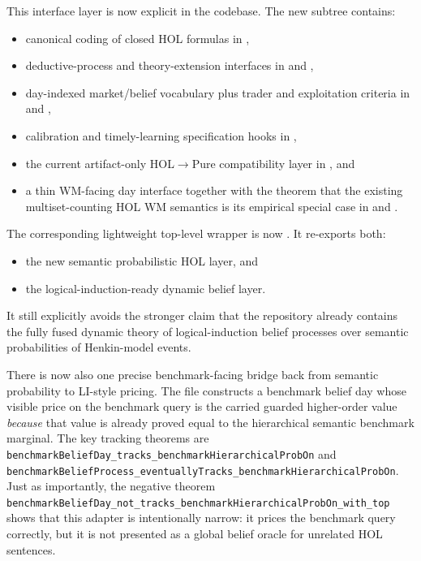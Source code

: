 \documentclass[11pt,openany]{report}
\begin{document}
This interface layer is now explicit in the codebase.  The new subtree
 contains:
\begin{itemize}
\item canonical coding of closed HOL formulas in
  ,
\item deductive-process and theory-extension interfaces in
   and
  ,
\item day-indexed market/belief vocabulary plus trader and exploitation
  criteria in
   and
  ,
\item calibration and timely-learning specification hooks in
  ,
\item the current artifact-only HOL$\to$Pure compatibility layer in
  , and
\item a thin WM-facing day interface together with the theorem that the
  existing multiset-counting HOL WM semantics is its empirical special case in
   and
  .
\end{itemize}

The corresponding lightweight top-level wrapper is now
.  It re-exports both:
\begin{itemize}
\item the new semantic probabilistic HOL layer, and
\item the logical-induction-ready dynamic belief layer.
\end{itemize}
It still explicitly avoids the stronger claim that the repository already
contains the fully fused dynamic theory of logical-induction belief processes
over semantic probabilities of Henkin-model events.

There is now also one precise benchmark-facing bridge back from semantic
probability to LI-style pricing.  The file
constructs a benchmark belief day whose visible price on the benchmark query is
the carried guarded higher-order value \emph{because} that value is already
proved equal to the hierarchical semantic benchmark marginal.  The key tracking
theorems are
\texttt{benchmarkBeliefDay\_tracks\_benchmarkHierarchicalProbOn} and
\texttt{benchmarkBeliefProcess\_eventuallyTracks\_benchmarkHierarchicalProbOn}.
Just as importantly, the negative theorem
\texttt{benchmarkBeliefDay\_not\_tracks\_benchmarkHierarchicalProbOn\_with\_top}
shows that this adapter is intentionally narrow: it prices the benchmark query
correctly, but it is not presented as a global belief oracle for unrelated HOL
sentences.
\end{document}
